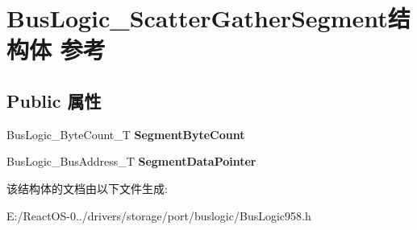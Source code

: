 \hypertarget{struct_bus_logic___scatter_gather_segment}{}\section{Bus\+Logic\+\_\+\+Scatter\+Gather\+Segment结构体 参考}
\label{struct_bus_logic___scatter_gather_segment}
\subsection*{Public 属性}
\begin{DoxyCompactItemize}
\item 
\mbox{\label{struct_bus_logic___scatter_gather_segment_aaa2a34b8d232ab0d7c09726a615dd9ab}} 
Bus\+Logic\+\_\+\+Byte\+Count\+\_\+T {\bfseries Segment\+Byte\+Count}
\item 
\mbox{\label{struct_bus_logic___scatter_gather_segment_ae3734e71f356189443cb7433ad477efb}} 
Bus\+Logic\+\_\+\+Bus\+Address\+\_\+T {\bfseries Segment\+Data\+Pointer}
\end{DoxyCompactItemize}


该结构体的文档由以下文件生成\+:\begin{DoxyCompactItemize}
\item 
E\+:/\+React\+O\+S-\/0../drivers/storage/port/buslogic/Bus\+Logic958.\+h\end{DoxyCompactItemize}
